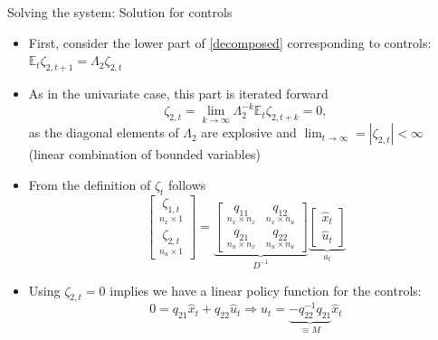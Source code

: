 \documentclass[handout,usepdftitle=false,xcolor=dvipsnames,aspectratio=169]{beamer}
\begin{document}
\begin{frame}{Solving the system: Solution for controls}
\begin{itemize}
\item First, consider the lower part of \eqref{decomposed} corresponding to controls: $ \mathbb{E}_t \zeta_{2,t+1}=\Lambda_2 \zeta_{2,t}$
\item As in the univariate case, this part is iterated forward
\begin{equation}
 \zeta_{2,t}=\lim_{k \rightarrow \infty} \Lambda_2^{-k} \mathbb{E}_t \zeta_{2,t+k}  = 0,
\end{equation}
as the diagonal elements of $\Lambda_2$ are explosive and $\lim_{t \rightarrow \infty} = |\zeta_{2,t}| < \infty$ (linear combination of bounded variables)
\item From the definition of $\zeta_t$ follows
\begin{equation}
 \left[ \begin{array}{c}
                \underset{n_x \times 1}{\zeta_{1,t}} \\
               \underset{n_u \times 1}{\zeta_{2,t}}
               \end{array} \right] =
               \underbrace{\left[\begin{array}{cc}
               \underset{n_x\times n_x}{q_{11}} & \underset{n_x\times n_u}{q_{12}} \\
               \underset{n_u\times n_x}{q_{21}} & \underset{n_u\times n_u}{q_{22}} \end{array} \right]}_{D^{-1}}
                 \underbrace{\left[  \begin{array}{c}
                                              \widehat{x}_t \\
                                              \widehat{u}_t
                                            \end{array}\right]}_{a_t}
\end{equation}
\item Using $ \zeta_{2,t}=0$ implies we have a linear policy function for the controls:
\begin{equation}\label{policy solution}
  0 = {q_{21}}{{\hat x}_t} + {q_{22}}{{\hat u}_t} \Rightarrow \widehat{u}_t = \underbrace{-q_{22}^{-1}q_{21} }_{\equiv M} \widehat{x}_t
\end{equation}
\end{itemize}
\end{frame}
\end{document}
